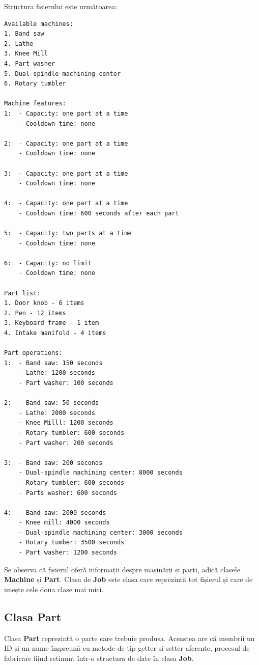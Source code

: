 \documentclass[12pt, twoside]{article}
\begin{document}
Structura fișierului este următoarea:
\begin{lstlisting}[frame={single}]
Available machines:
1. Band saw
2. Lathe
3. Knee Mill
4. Part washer
5. Dual-spindle machining center
6. Rotary tumbler

Machine features:
1:  - Capacity: one part at a time
    - Cooldown time: none

2:  - Capacity: one part at a time
    - Cooldown time: none

3:  - Capacity: one part at a time
    - Cooldown time: none

4:  - Capacity: one part at a time
    - Cooldown time: 600 seconds after each part

5:  - Capacity: two parts at a time
    - Cooldown time: none

6:  - Capacity: no limit
    - Cooldown time: none

Part list:
1. Door knob - 6 items
2. Pen - 12 items
3. Keyboard frame - 1 item
4. Intake manifold - 4 items

Part operations:
1:  - Band saw: 150 seconds
    - Lathe: 1200 seconds
    - Part washer: 100 seconds

2:  - Band saw: 50 seconds
    - Lathe: 2000 seconds
    - Knee Milll: 1200 seconds
    - Rotary tumbler: 600 seconds
    - Part washer: 200 seconds

3:  - Band saw: 200 seconds
    - Dual-spindle machining center: 8000 seconds
    - Rotary tumbler: 600 seconds
    - Parts washer: 600 seconds

4:  - Band saw: 2000 seconds
    - Knee mill: 4000 seconds
    - Dual-spindle machining center: 3000 seconds
    - Rotary tumber: 3500 seconds
    - Part washer: 1200 seconds
\end{lstlisting}


Se observa că fișierul oferă informații despre mașinării
și parti, adică clasele \textbf{Machine} și \textbf{Part}.
Clasa de \textbf{Job} este clasa care reprezintă tot fișierul
și care de unește cele doua clase mai mici.

\subsection{Clasa Part}

Clasa \textbf{Part} reprezintă o parte care trebuie produsa.
Aceastea are că membrii un ID și un nume împreună cu metode
de tip getter și setter aferente, procesul de fabricare
fiind retinunt într-o structura de date în clasa \textbf{Job}.
\end{document}
